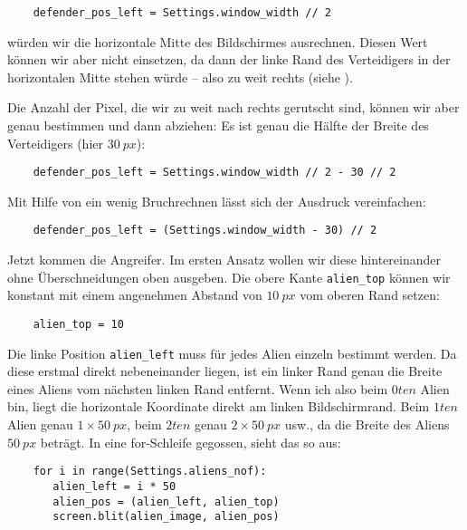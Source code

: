 \lstset{firstnumber=23}
\begin{lstlisting}
	defender_pos_left = Settings.window_width // 2
\end{lstlisting}

würden wir die horizontale Mitte des Bildschirmes ausrechnen. Diesen Wert können wir aber nicht einsetzen, da dann der linke Rand des Verteidigers in der horizontalen Mitte stehen würde -- also zu weit rechts (siehe ). 


Die Anzahl der Pixel, die wir zu weit nach rechts gerutscht sind, können wir aber genau bestimmen und dann abziehen: Es ist genau die Hälfte der Breite des Verteidigers (hier $30~px$):
\begin{lstlisting}
	defender_pos_left = Settings.window_width // 2 - 30 // 2
\end{lstlisting}

Mit Hilfe von ein wenig Bruchrechnen lässt sich der Ausdruck vereinfachen:
\begin{lstlisting}
	defender_pos_left = (Settings.window_width - 30) // 2
\end{lstlisting}

Jetzt kommen die Angreifer. Im ersten Ansatz wollen wir diese hintereinander ohne Überschneidungen oben ausgeben. Die obere Kante \texttt{alien\_top} können wir konstant mit einem angenehmen Abstand von $10~px$ vom oberen Rand setzen:

\lstset{firstnumber=42}
\begin{lstlisting}
	alien_top = 10 
\end{lstlisting}

Die linke Position \texttt{alien\_left} muss für jedes Alien einzeln bestimmt werden. Da diese erstmal direkt nebeneinander liegen, ist ein linker Rand genau die Breite eines Aliens vom nächsten linken Rand entfernt. Wenn ich also beim $0ten$ Alien bin, liegt die horizontale Koordinate direkt am linken Bildschirmrand. Beim $1ten$ Alien genau $1\times50~px$, beim $2ten$ genau $2\times50~px$ usw., da die Breite des Aliens $50~px$ beträgt. In eine for-Schleife gegossen, sieht das so aus:

\lstset{firstnumber=43}
\begin{lstlisting}
	for i in range(Settings.aliens_nof):
	   alien_left = i * 50
	   alien_pos = (alien_left, alien_top)
	   screen.blit(alien_image, alien_pos)
\end{lstlisting}


